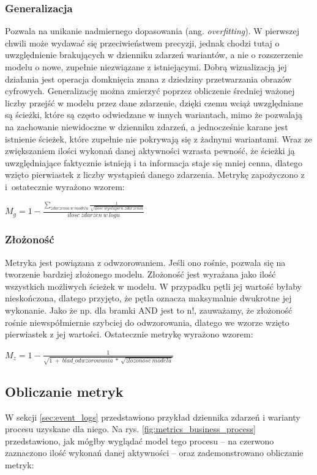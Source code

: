 \subsubsection{Generalizacja}
Pozwala na unikanie nadmiernego dopasowania (ang. \textit{overfitting}). W pierwszej chwili może wydawać się przeciwieństwem precyzji, jednak chodzi tutaj o uwzględnienie brakujących w dzienniku zdarzeń wariantów, a nie o rozszerzenie modelu o nowe, zupełnie niezwiązane z istniejącymi. Dobrą wizualizacją jej działania jest operacja domknięcia znana z dziedziny przetwarzania obrazów cyfrowych. Generalizację można zmierzyć poprzez obliczenie średniej ważonej liczby przejść w modelu przez dane zdarzenie, dzięki czemu wciąż uwzględniane są ścieżki, które są często odwiedzane w innych wariantach, mimo że pozwalają na zachowanie niewidoczne w dzienniku zdarzeń, a jednocześnie karane jest istnienie ścieżek, które zupełnie nie pokrywają się z żadnymi wariantami. Wraz ze zwiększaniem ilości wykonań danej aktywności wzrasta pewność, że ścieżki ją uwzględniające faktycznie istnieją i ta informacja staje się mniej cenna, dlatego wzięto pierwiastek z liczby wystąpień danego zdarzenia. Metrykę zapożyczono z \cite{qd-in-discovery} i~ostatecznie wyrażono wzorem:
\begin{center}
$M_g = 1 - \frac{\sum_{zdarzenia\ w\ modelu} \frac{1}{\sqrt{ilosc\ wystapien\ zdarzenia}}}{ilosc\ zdarzen\ w\ logu} $
\end{center}
\subsubsection{Złożoność}
Metryka jest powiązana z odwzorowaniem. Jeśli ono rośnie, pozwala się na tworzenie bardziej złożonego modelu. Złożoność jest wyrażana jako ilość wszystkich możliwych ścieżek w modelu. W przypadku pętli jej wartość byłaby nieskończona, dlatego przyjęto, że pętla oznacza maksymalnie dwukrotne jej wykonanie. Jako że np. dla bramki AND jest to n!, zauważamy, że złożoność rośnie niewspółmiernie szybciej do odwzorowania, dlatego we wzorze wzięto pierwiastek z jej wartości. Ostatecznie metrykę wyrażono wzorem: 
\begin{center}
$M_z = 1 - \frac{1}{\sqrt{1\ +\ blad\_odwzorowania\ *\ \sqrt{zlozonosc\ modelu}}} $
\end{center}
\subsection{Obliczanie metryk}
W sekcji \ref{sec:event_logs} przedstawiono przykład dziennika zdarzeń i warianty procesu uzyskane dla niego. Na rys. \ref{fig:metrics_business_process} przedstawiono, jak mógłby wyglądać model tego procesu -- na czerwono zaznaczono ilość wykonań danej aktywności -- oraz zademonstrowano obliczanie metryk:
\newline

